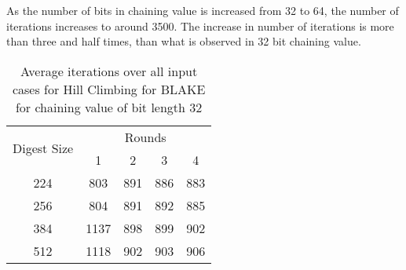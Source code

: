As the number of bits in chaining value is increased from 32 to 64, the number of iterations increases to around 3500.
The increase in number of iterations is more than three and half times, than what is observed in 32 bit chaining value.
\begin{table}
  \begin{center}
    \begin{tabular}{ | c | c | c | c | c | } \hline
     \multirow{2}{*}{Digest Size} & \multicolumn{4}{c|}{Rounds} \\ \cline{2-5}
                                  & 1    & 2   & 3   & 4   \\ \hline
     224                          & 803  & 891 & 886 & 883 \\ \hline
     256                          & 804  & 891 & 892 & 885 \\ \hline
     384                          & 1137 & 898 & 899 & 902 \\ \hline
     512                          & 1118 & 902 & 903 & 906 \\ \hline
    \end{tabular}
    \caption{Average iterations over all input cases for Hill Climbing for BLAKE for chaining value
    of bit length 32}
  \end{center}
\end{table}

